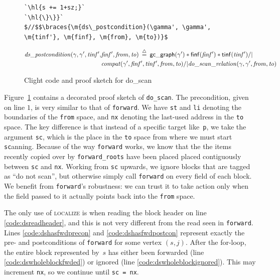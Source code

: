 \documentclass[acmsmall,screen]{acmart}
\makeatletter
\newcommand{\li}[1]{{\texttt{\small #1}}}
\newcommand{\finf}{finf}
\newcommand{\tinf}{tinf}
\newcommand{\braces}[1]{\left\{\!\!\!\begin{array}{l@{}} #1 \end{array}\right\}}
\newcommand{\ga}{\gamma}
\newcommand{\defeq}{\mathbin{\stackrel{\triangle}{=}}}
\newcommand{\tx}[1]{\text{#1}}
\newcommand{\p}[1]{\ensuremath{\mathsf{#1}}} \newcommand{\m}[1]{\ensuremath{\mathit{#1}}} \newcommand{\ma}[1]{\ensuremath{\mathcal{#1}}} \let\ramify\lightning
\newcommand{\infrulestyle}[1]{\textsc{#1}}
\newcommand{\hl}[1]{\colorbox{lightgray}{#1}}
\makeatother
\begin{document}
\begin{figure}[t]
\begin{lstlisting}[multicols = 2]
  `\hl{s += 1+sz;}`
`\hl{\}\}}`
$//$$\braces{\m{ds\_postcondition}(\gamma', \gamma', \m{tinf'}, \m{finf}, \m{from}, \m{to})}$
\end{lstlisting}
\footnotesize{
\vspace{-0.8em}
\begin{equation*}
\begin{split}
\m{ds\_postcondition}(\gamma, \ga', \m{tinf'}, &\m{finf'}, \m{from}, \m{to}) \; \defeq \; 
   \p{gc{\_}graph}(\ga') * \p{\finf}(\m{\finf'}) * \p{\tinf}(\m{\tinf'}) /| \null \\
   &\m{compat}(\ga', \m{\finf'}, \m{\tinf'}, \m{from}, \m{to}) /|
   \m{do\_scan\_relation}(\ga, \ga', \m{from}, \m{to})
\end{split}
\end{equation*}

}
\vspace{-0.4em}
\caption{Clight code and proof sketch for do\_scan}
\label{fig:doscan}
\vspace{-1em}
\end{figure}

\renewcommand{\tx}[1]{\text{#1}}
 
Figure~\ref{fig:doscan} contains a decorated proof sketch of \li{do\_scan}.
The precondition, given on line $1$, is very similar to that of 
\li{forward}. We have \li{st} and \li{li} denoting the boundaries
of the \li{from} space, and \li{nx} denoting the last-used address
in the \li{to} space. The key difference is that instead of a specific
target like~\li{p}, we take the argument \li{sc}, 
which is the place in the \li{to} space from where we must start \li{sc}anning.
Because of the way \li{forward} works, we know that the 
the items recently copied over by \li{forward\_roots} 
have been placed placed contiguously between \li{sc} and \li{nx}. 
Working from \li{sc} upwards, we ignore blocks that are tagged as 
``do not scan'', but otherwise simply call \li{forward} on every field
of each block. We benefit from \li{forward}'s robustness: we can trust it to 
take action only when the field passed to it actually points back into the 
\li{from} space. 


The only use of \infrulestyle{localize} is when
reading the block header on line \ref{code:dsreadheader}, 
and this is not very different from the read seen in \li{forward}. 
Lines \ref{code:dshasfwdprecon} and \ref{code:dshasfwdpostcon} 
represent exactly the pre- and postconditions of \li{forward}
for some vertex \m{(s, j)}. 
After the for-loop, the entire block represented by~\m{s} has either been
forwarded (line \ref{code:dswholeblockfwded}) or 
ignored (line \ref{code:dswholeblockignored}). 
This may increment \li{nx}, so we continue until \li{sc~=~nx}.
\end{document}
